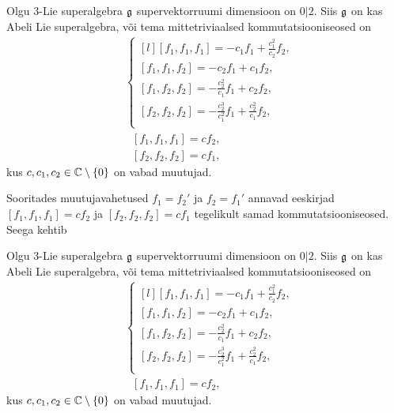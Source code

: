 \begin{lau}
    Olgu $3$-Lie superalgebra $\mathfrak{g}$ supervektorruumi dimensioon on $0|2$.
    Siis $\mathfrak{g}$ on kas Abeli Lie superalgebra, või tema mittetriviaalsed
    kommutatsiooniseosed on
    \renewcommand\arraystretch{1.5}
    \begin{align}
        & \left\{
            \begin{matrix*}[l]
                [f_1, f_1, f_1] = -c_1 f_1 + \frac{c_1^2}{c_2} f_2, \\
                [f_1, f_1, f_2] = -c_2 f_1 + c_1 f_2, \\
                [f_1, f_2, f_2] = -\frac{c_2^2}{c_1} f_1 + c_2 f_2, \\
                [f_2, f_2, f_2] = -\frac{c_2^3}{c_1^2} f_1 +
                    \frac{c_2^2}{c_1} f_2, \\
            \end{matrix*}
        \right. \\[0.2cm]
        &\ \ \ [f_1, f_1, f_1] = c f_2, \\[0.2cm]
        &\ \ \ [f_2, f_2, f_2] = c f_1,
    \end{align}
    \renewcommand\arraystretch{1}
    kus $c, c_1, c_2 \in \mathbb{C} \setminus \{ 0 \}$ on vabad muutujad.
\end{lau}

Sooritades muutujavahetused $f_1 = f_2'$ ja $f_2 = f_1'$ annavad
eeskirjad $[f_1, f_1, f_1] = c f_2$ ja $[f_2, f_2, f_2] = c f_1$
tegelikult samad kommutatsiooniseosed. Seega kehtib
\begin{thm}
    Olgu $3$-Lie superalgebra $\mathfrak{g}$ supervektorruumi dimensioon on $0|2$.
    Siis $\mathfrak{g}$ on kas Abeli Lie superalgebra, või tema mittetriviaalsed
    kommutatsiooniseosed on
    \renewcommand\arraystretch{1.5}
    \begin{align}
        & \left\{
            \begin{matrix*}[l]
                [f_1, f_1, f_1] = -c_1 f_1 + \frac{c_1^2}{c_2} f_2, \\
                [f_1, f_1, f_2] = -c_2 f_1 + c_1 f_2, \\
                [f_1, f_2, f_2] = -\frac{c_2^2}{c_1} f_1 + c_2 f_2, \\
                [f_2, f_2, f_2] = -\frac{c_2^3}{c_1^2} f_1 +
                    \frac{c_2^2}{c_1} f_2, \\
            \end{matrix*}
        \right. \\[0.2cm]
        &\ \ \ [f_1, f_1, f_1] = c f_2,
    \end{align}
    \renewcommand\arraystretch{1}
    kus $c, c_1, c_2 \in \mathbb{C} \setminus \{ 0 \}$ on vabad muutujad.
\end{thm}

